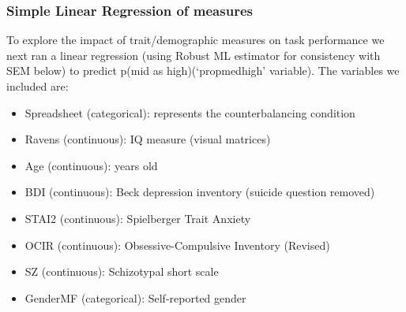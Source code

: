 \documentclass[]{article}
\providecommand{\tightlist}{%
  \setlength{\itemsep}{0pt}\setlength{\parskip}{0pt}}
\begin{document}
\subsubsection{Simple Linear Regression of
measures}\label{simple-linear-regression-of-measures}

To explore the impact of trait/demographic measures on task performance
we next ran a linear regression (using Robust ML estimator for
consistency with SEM below) to predict p(mid as high)(`propmedhigh'
variable). The variables we included are:

\begin{itemize}
\tightlist
\item
  Spreadsheet (categorical): represents the counterbalancing condition
\item
  Ravens (continuous): IQ measure (visual matrices)
\item
  Age (continuous): years old
\item
  BDI (continuous): Beck depression inventory (suicide question removed)
\item
  STAI2 (continuous): Spielberger Trait Anxiety
\item
  OCIR (continuous): Obsessive-Compulsive Inventory (Revised)
\item
  SZ (continuous): Schizotypal short scale
\item
  GenderMF (categorical): Self-reported gender
\end{itemize}
\end{document}
